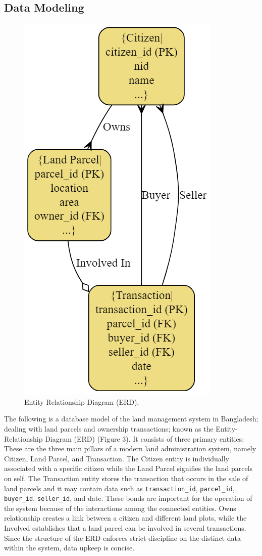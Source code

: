 \documentclass[conference]{IEEEtran}
\begin{document}
\subsection{Data Modeling}
    \begin{figure}[H]
        \centerline{\includegraphics[width=0.4\linewidth]{fig3.png}}
        \caption{Entity Relationship Diagram (ERD).}
        \label{fig3}
    \end{figure}

The following is a database model of the land management system in Bangladesh; dealing with land parcels and ownership transactions; known as the Entity-Relationship Diagram (ERD) (Figure 3). It consists of three primary entities: These are the three main pillars of a modern land administration system, namely Citizen, Land Parcel, and Transaction. The Citizen entity is individually associated with a specific citizen while the Land Parcel signifies the land parcels on self. The Transaction entity stores the transaction that occurs in the sale of land parcels and it may contain data such as \texttt{transaction\_id}, \texttt{parcel\_id}, \texttt{buyer\_id}, \texttt{seller\_id}, and date. These bonds are important for the operation of the system because of the interactions among the connected entities. Owns relationship creates a link between a citizen and different land plots, while the Involved establishes that a land parcel can be involved in several transactions. Since the structure of the ERD enforces strict discipline on the distinct data within the system, data upkeep is concise.
\end{document}

